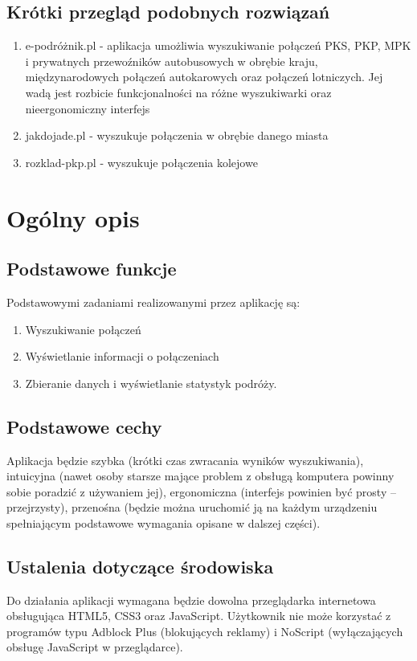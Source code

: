 \documentclass[12pt,a4paper]{report}
\begin{document}
\subsection{Krótki przegląd podobnych rozwiązań}
\begin{enumerate}
	\item e-podróżnik.pl - aplikacja umożliwia wyszukiwanie połączeń PKS, PKP, MPK i prywatnych przewoźników autobusowych w obrębie kraju, międzynarodowych połączeń autokarowych oraz połączeń lotniczych. Jej wadą jest rozbicie funkcjonalności na różne wyszukiwarki oraz nieergonomiczny interfejs
	\item jakdojade.pl - wyszukuje połączenia w obrębie danego miasta
	\item rozklad-pkp.pl - wyszukuje połączenia kolejowe
\end{enumerate}
\newpage
\section{Ogólny opis}
\subsection{Podstawowe funkcje}
	Podstawowymi zadaniami realizowanymi przez aplikację są:
	\begin{enumerate}
	 	\item Wyszukiwanie połączeń
	 	\item Wyświetlanie informacji o połączeniach
	 	\item Zbieranie danych i wyświetlanie statystyk podróży.
	\end{enumerate}
\subsection{Podstawowe cechy}
	Aplikacja będzie szybka (krótki czas zwracania wyników wyszukiwania), intuicyjna (nawet osoby starsze mające problem z obsługą komputera powinny sobie poradzić z używaniem jej), ergonomiczna (interfejs powinien być prosty -- przejrzysty), przenośna (będzie można uruchomić ją na każdym urządzeniu spełniającym podstawowe wymagania opisane w dalszej części).
\subsection{Ustalenia dotyczące środowiska}
	Do działania aplikacji wymagana będzie dowolna przeglądarka internetowa obsługująca HTML5, CSS3 oraz JavaScript. Użytkownik nie może korzystać z programów typu Adblock Plus (blokujących reklamy) i NoScript (wyłączających obsługę JavaScript w przeglądarce).
\end{document}
